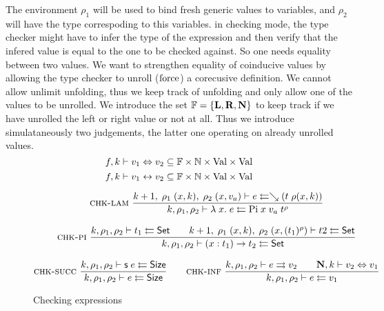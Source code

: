 The environment $\rho_1$ will be used to bind fresh generic values to variables, and $\rho_2$ will have the type correspoding to this variables. in checking mode, the type checker might have to infer the type of the expression and then verify that the infered value is equal to the one to be checked against.
So one needs equality between two values.
We want to strengthen equality of coinducive values by allowing the type checker to unroll ($\mathrm{force}$) a corecusive definition. We cannot allow unlimit unfolding, thus we keep track of unfolding and only allow one of the values to be unrolled.
We introduce the set $ \mathbb{F} = \{\mathbf{L}, \mathbf{R}, \mathbf{N} \} $ to keep track if we have unrolled the left or right value or not at all.
Thus we introduce simulataneously two judgements, the latter one operating on already unrolled values.
\[f,k\vdash v_1\Leftrightarrow v_2 \subseteq \mathbb{F} \times \mathbb{N} \times \mathrm{Val} \times \mathrm{Val} \]
\[f,k\vdash v_1{\;\leftrightarrow\;}v_2 \subseteq \mathbb{F} \times \mathbb{N} \times\mathrm{Val} \times \mathrm{Val} \]

\begin{figure}[p]

\begin{gather*}
\mbox{\sc chk-lam}\ \dfrac{k+1, \; \rho_1 \; (x,k), \; \rho_2 \; (x,v_a)\vdash e\leftleftarrows\searrow (t \;  \rho (x,k))}{k,\rho_1,\rho_2\vdash\lambda\; x .\;{e}\leftleftarrows\mathrm{Pi} \; x \; v_a \; t^{\rho}}
\\[2ex]
\mbox{\sc chk-pi}\ \dfrac{k,\rho_1,\rho_2\vdash t_1\leftleftarrows\mathsf{Set}
\qquad
k+1, \; \rho_1 \; (x,k), \; \rho_2 \; (x,(t_1)^{\rho})\vdash t2\leftleftarrows\mathsf{Set}
}{k,\rho_1,\rho_2\vdash( x : t_1 ) \rightarrow{t_2}\leftleftarrows\mathsf{Set}}
\\[2ex]
\mbox{\sc chk-succ}\ \dfrac{k,\rho_1,\rho_2\vdash\mathsf{s}\; e\leftleftarrows\mathsf{Size}}{k,\rho_1,\rho_2\vdash e\leftleftarrows\mathsf{Size}}
\qquad
\mbox{\sc chk-inf}\ \dfrac{k,\rho_1,\rho_2\vdash e\rightrightarrows v_2
\qquad
\mathbf{N},k\vdash v_2\Leftrightarrow v_1}{k,\rho_1,\rho_2\vdash e\leftleftarrows v_1}
\end{gather*}
\caption{Checking expressions}
\end{figure}

